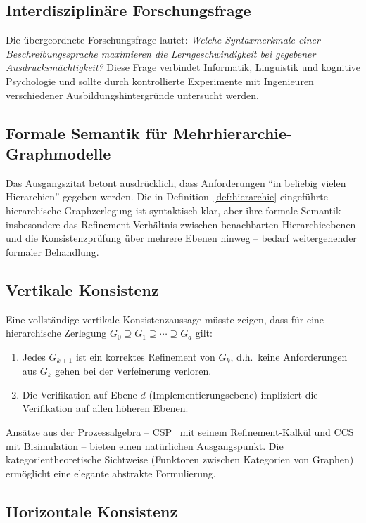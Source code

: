 ﻿\documentclass[a4paper,12pt]{report}
\theoremstyle{definition}
\begin{document}
\subsection{Interdisziplinäre Forschungsfrage}

Die übergeordnete Forschungsfrage lautet: \emph{Welche Syntaxmerkmale einer
Beschreibungssprache maximieren die Lerngeschwindigkeit bei gegebener
Ausdrucksmächtigkeit?} Diese Frage verbindet Informatik, Linguistik und kognitive
Psychologie und sollte durch kontrollierte Experimente mit Ingenieuren verschiedener
Ausbildungshintergründe untersucht werden.

\subsection{Formale Semantik für Mehrhierarchie-Graphmodelle}

Das Ausgangszitat betont ausdrücklich, dass Anforderungen \enquote{in beliebig vielen
Hierarchien} gegeben werden. Die in Definition~\ref{def:hierarchie} eingeführte
hierarchische Graphzerlegung ist syntaktisch klar, aber ihre formale Semantik --
insbesondere das Refinement-Verhältnis zwischen benachbarten Hierarchieebenen und
die Konsistenzprüfung über mehrere Ebenen hinweg -- bedarf weitergehender formaler
Behandlung.

\subsection{Vertikale Konsistenz}

Eine vollständige vertikale Konsistenzaussage müsste zeigen, dass für eine hierarchische
Zerlegung $G_0 \supseteq G_1 \supseteq \cdots \supseteq G_d$ gilt:
\begin{enumerate}
  \item Jedes $G_{k+1}$ ist ein korrektes Refinement von $G_k$, d.h.\ keine Anforderungen
        aus $G_k$ gehen bei der Verfeinerung verloren.
  \item Die Verifikation auf Ebene $d$ (Implementierungsebene) impliziert die Verifikation
        auf allen höheren Ebenen.
\end{enumerate}
Ansätze aus der Prozessalgebra -- CSP~\cite{hoare1978} mit seinem Refinement-Kalkül
und CCS~\cite{milner1980} mit Bisimulation -- bieten einen natürlichen Ausgangspunkt.
Die kategorientheoretische Sichtweise (Funktoren zwischen Kategorien von Graphen)
ermöglicht eine elegante abstrakte Formulierung.

\subsection{Horizontale Konsistenz}
\end{document}
